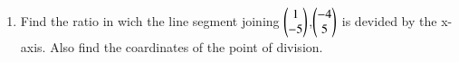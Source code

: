 \renewcommand{\theequation}{\theenumi}
\begin{enumerate}[label=\arabic*.,ref=\thesubsection.\theenumi]

\item Find the ratio in wich the line segment joining $\begin{pmatrix}1\\-5\end{pmatrix}$,$\begin{pmatrix}-4\\5\end{pmatrix}$ is devided by the x-axis. Also find the coardinates of the point of division.
\end{enumerate}